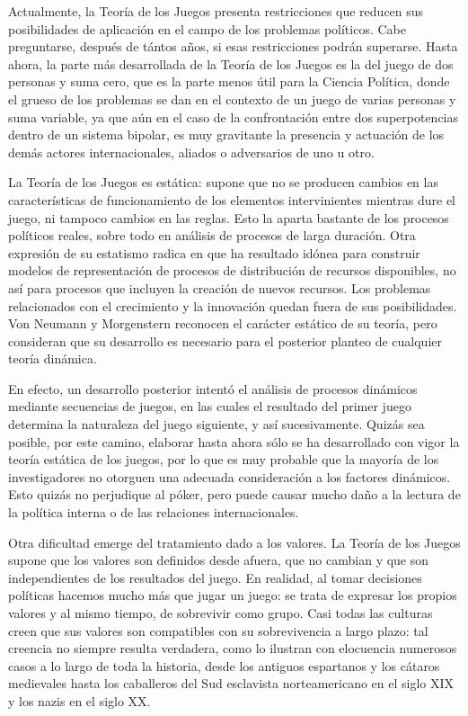 \documentclass[
]{book}
\begin{document}
Actualmente, la Teoría de los Juegos presenta restricciones que reducen sus posibilidades de aplicación en el campo de los problemas políticos. Cabe preguntarse, después de tántos años, si esas restricciones podrán superarse. Hasta ahora, la parte más desarrollada de la Teoría de los Juegos es la del juego de dos personas y suma cero, que es la parte menos útil para la Ciencia Política, donde el grueso de los problemas se dan en el contexto de un juego de varias personas y suma variable, ya que aún en el caso de la confrontación entre dos superpotencias dentro de un sistema bipolar, es muy gravitante la presencia y actuación de los demás actores internacionales, aliados o adversarios de uno u otro.

La Teoría de los Juegos es estática: supone que no se producen cambios en las características de funcionamiento de los elementos intervinientes mientras dure el juego, ni tampoco cambios en las reglas. Esto la aparta bastante de los procesos políticos reales, sobre todo en análisis de procesos de larga duración. Otra expresión de su estatismo radica en que ha resultado idónea para construir modelos de representación de procesos de distribución de recursos disponibles, no así para procesos que incluyen la creación de nuevos recursos. Los problemas relacionados con el crecimiento y la innovación quedan fuera de sus posibilidades. Von Neumann y Morgenstern reconocen el carácter estático de su teoría, pero consideran que su desarrollo es necesario para el posterior planteo de cualquier teoría dinámica.

En efecto, un desarrollo posterior intentó el análisis de procesos dinámicos mediante secuencias de juegos, en las cuales el resultado del primer juego determina la naturaleza del juego siguiente, y así sucesivamente. Quizás sea posible, por este camino, elaborar hasta ahora sólo se ha desarrollado con vigor la teoría estática de los juegos, por lo que es muy probable que la mayoría de los investigadores no otorguen una adecuada consideración a los factores dinámicos. Esto quizás no perjudique al póker, pero puede causar mucho daño a la lectura de la política interna o de las relaciones internacionales.

Otra dificultad emerge del tratamiento dado a los valores. La Teoría de los Juegos supone que los valores son definidos desde afuera, que no cambian y que son independientes de los resultados del juego. En realidad, al tomar decisiones políticas hacemos mucho más que jugar un juego: se trata de expresar los propios valores y al mismo tiempo, de sobrevivir como grupo. Casi todas las culturas creen que sus valores son compatibles con su sobrevivencia a largo plazo: tal creencia no siempre resulta verdadera, como lo ilustran con elocuencia numerosos casos a lo largo de toda la historia, desde los antiguos espartanos y los cátaros medievales hasta los caballeros del Sud esclavista norteamericano en el siglo XIX y los nazis en el siglo XX.
\end{document}
